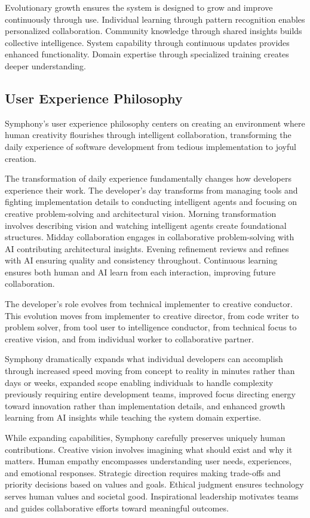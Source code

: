 Evolutionary growth ensures the system is designed to grow and improve continuously through use. Individual learning through pattern recognition enables personalized collaboration. Community knowledge through shared insights builds collective intelligence. System capability through continuous updates provides enhanced functionality. Domain expertise through specialized training creates deeper understanding.

\subsection{User Experience Philosophy}

Symphony's user experience philosophy centers on creating an environment where human creativity flourishes through intelligent collaboration, transforming the daily experience of software development from tedious implementation to joyful creation.

The transformation of daily experience fundamentally changes how developers experience their work. The developer's day transforms from managing tools and fighting implementation details to conducting intelligent agents and focusing on creative problem-solving and architectural vision. Morning transformation involves describing vision and watching intelligent agents create foundational structures. Midday collaboration engages in collaborative problem-solving with AI contributing architectural insights. Evening refinement reviews and refines with AI ensuring quality and consistency throughout. Continuous learning ensures both human and AI learn from each interaction, improving future collaboration.

The developer's role evolves from technical implementer to creative conductor. This evolution moves from implementer to creative director, from code writer to problem solver, from tool user to intelligence conductor, from technical focus to creative vision, and from individual worker to collaborative partner.

Symphony dramatically expands what individual developers can accomplish through increased speed moving from concept to reality in minutes rather than days or weeks, expanded scope enabling individuals to handle complexity previously requiring entire development teams, improved focus directing energy toward innovation rather than implementation details, and enhanced growth learning from AI insights while teaching the system domain expertise.

While expanding capabilities, Symphony carefully preserves uniquely human contributions. Creative vision involves imagining what should exist and why it matters. Human empathy encompasses understanding user needs, experiences, and emotional responses. Strategic direction requires making trade-offs and priority decisions based on values and goals. Ethical judgment ensures technology serves human values and societal good. Inspirational leadership motivates teams and guides collaborative efforts toward meaningful outcomes.

